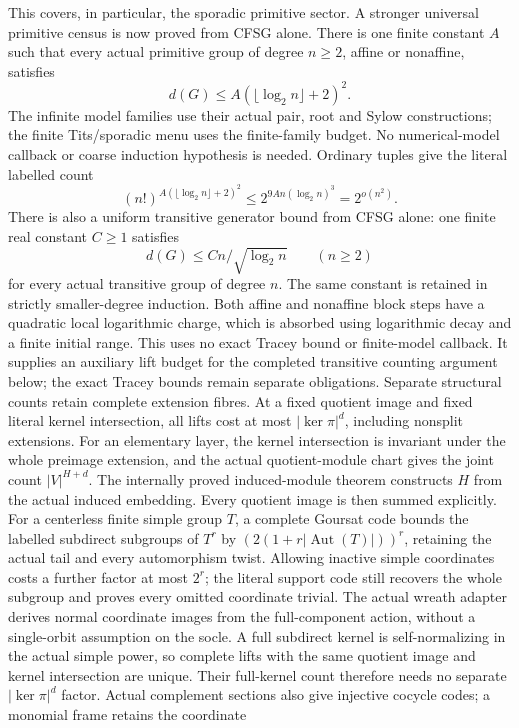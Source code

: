 This covers, in particular, the sporadic primitive sector. A stronger
universal primitive census is now proved from CFSG alone. There is one
finite constant $A$ such that every actual primitive group of degree
$n\ge2$, affine or nonaffine, satisfies
\[
 d(G)\le A(\lfloor\log_2 n\rfloor+2)^2.
\]
The infinite model families use their actual pair, root and Sylow
constructions; the finite Tits/sporadic menu uses the finite-family
budget. No numerical-model callback or coarse induction hypothesis is
needed. Ordinary tuples give the literal labelled count
\[
 (n!)^{A(\lfloor\log_2 n\rfloor+2)^2}
 \le 2^{9An(\log_2 n)^3}=2^{o(n^2)}.
\]
There is also a uniform transitive generator bound from CFSG alone:
one finite real constant $C\ge1$ satisfies
\[
 d(G)\le Cn/\sqrt{\log_2 n}\qquad(n\ge2)
\]
for every actual transitive group of degree $n$. The same constant is
retained in strictly smaller-degree induction. Both affine and
nonaffine block steps have a quadratic local logarithmic charge, which
is absorbed using logarithmic decay and a finite initial range. This
uses no exact Tracey bound or finite-model callback. It supplies an
auxiliary lift budget for the completed transitive counting argument
below; the exact Tracey bounds remain separate obligations.
Separate structural counts retain complete extension fibres. At a fixed
quotient image and fixed literal kernel intersection, all lifts cost at
most $|\ker\pi|^d$, including nonsplit extensions. For an elementary
layer, the kernel intersection is invariant under the whole preimage
extension, and the actual quotient-module chart gives the joint count
$|V|^{H+d}$. The internally proved induced-module theorem constructs $H$
from the actual induced embedding. Every quotient image is then summed
explicitly. For a centerless finite simple group $T$, a complete Goursat
code bounds the labelled subdirect subgroups of $T^r$ by
$(2(1+r|\operatorname{Aut}(T)|))^r$, retaining the actual tail and every
automorphism twist. Allowing inactive simple coordinates costs a further
factor at most $2^r$; the literal support code still recovers the whole
subgroup and proves every omitted coordinate trivial. The actual wreath
adapter derives normal coordinate images from the full-component action,
without a single-orbit assumption on the socle. A full subdirect kernel is self-normalizing in
the actual simple power, so complete lifts with the same quotient image
and kernel intersection are unique. Their full-kernel count therefore
needs no separate $|\ker\pi|^d$ factor. Actual complement sections also
give injective cocycle codes; a monomial frame retains the coordinate
